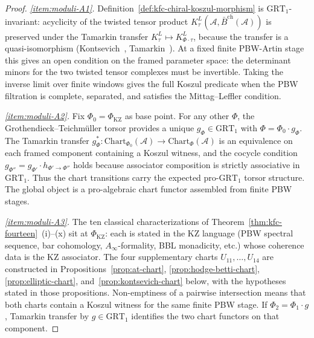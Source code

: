 \documentclass[11pt,reqno]{amsart}
\theoremstyle{definition}
\theoremstyle{remark}
\newcommand{\cA}{\mathcal{A}}
\newcommand{\barBch}{\bar{B}^{\mathrm{ch}}}
\newcommand{\Ainfty}{A_\infty}
\numberwithin{equation}{section}
\begin{document}
\begin{proof}
\emph{\ref{item:moduli-A1}.}
Definition~\ref{def:kfc-chiral-koszul-morphism} is
$\mathrm{GRT}_1$-invariant: acyclicity of the twisted tensor
product $K_\tau^L(\cA,\barBch(\cA))$ is preserved under the
Tamarkin transfer $K_\tau^L \mapsto K_{\Phi \cdot \tau}^L$,
because the transfer is a quasi-isomorphism
(Kontsevich~\cite{Kontsevich99}, Tamarkin~\cite{Tamarkin03}).
At a fixed finite PBW-Artin stage this gives an open condition on
the framed parameter space: the determinant minors for the two
twisted tensor complexes must be invertible. Taking the inverse
limit over finite windows gives the full Koszul predicate when the
PBW filtration is complete, separated, and satisfies the
Mittag--Leffler condition.

\emph{\ref{item:moduli-A2}.}
Fix $\Phi_0 = \Phi_{\mathrm{KZ}}$ as base point. For any other
$\Phi$, the Grothendieck--Teichm\"uller torsor provides a unique
$g_{\Phi} \in \mathrm{GRT}_1$ with $\Phi = \Phi_0 \cdot g_\Phi$.
The Tamarkin transfer
$g_\Phi^* \colon \mathrm{Chart}_{\Phi_0}(\cA) \to
\mathrm{Chart}_\Phi(\cA)$
is an equivalence on each framed component containing a Koszul
witness, and the cocycle condition
$g_{\Phi''} = g_{\Phi'} \cdot h_{\Phi' \to \Phi''}$
holds because associator composition is strictly associative in
$\mathrm{GRT}_1$. Thus the chart transitions carry the expected
pro-\(\mathrm{GRT}_1\) torsor structure. The global object is a
pro-algebraic chart functor assembled from finite PBW stages.

\emph{\ref{item:moduli-A3}.}
The ten classical characterizations of
Theorem~\ref{thm:kfc-fourteen}~(i)--(x) sit at $\Phi_{\mathrm{KZ}}$:
each is stated in the KZ language (PBW spectral sequence, bar
cohomology, $\Ainfty$-formality, BBL monadicity, etc.) whose
coherence data is the KZ associator. The four supplementary
charts $U_{11},\ldots,U_{14}$ are constructed in
Propositions~\ref{prop:at-chart}, \ref{prop:hodge-betti-chart},
\ref{prop:elliptic-chart}, and~\ref{prop:kontsevich-chart}
below, with the hypotheses stated in those propositions.
Non-emptiness of a pairwise intersection means that both charts
contain a Koszul witness for the same finite PBW stage.
If $\Phi_2=\Phi_1\cdot g$, Tamarkin transfer by
$g\in\mathrm{GRT}_1$ identifies the two chart functors on that
component.


\end{proof}
\end{document}

